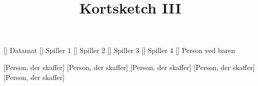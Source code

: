 \documentclass[a4paper,11pt]{article}
\title{Kortsketch III}
\author{}
\begin{document}
\maketitle

\begin{roles}
[] Datamat
[] Spiller 1
[] Spiller 2
[] Spiller 3
[] Spiller 4
[] Person ved baren
\end{roles}

\begin{props}
[Person, der skaffer]
[Person, der skaffer]
[Person, der skaffer]
[Person, der skaffer]
[Person, der skaffer]
\end{props}
\end{document}
